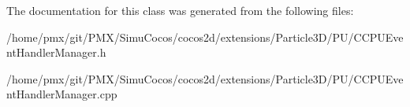 The documentation for this class was generated from the following files\+:\begin{DoxyCompactItemize}
\item 
/home/pmx/git/\+P\+M\+X/\+Simu\+Cocos/cocos2d/extensions/\+Particle3\+D/\+P\+U/C\+C\+P\+U\+Event\+Handler\+Manager.\+h\item 
/home/pmx/git/\+P\+M\+X/\+Simu\+Cocos/cocos2d/extensions/\+Particle3\+D/\+P\+U/C\+C\+P\+U\+Event\+Handler\+Manager.\+cpp\end{DoxyCompactItemize}

